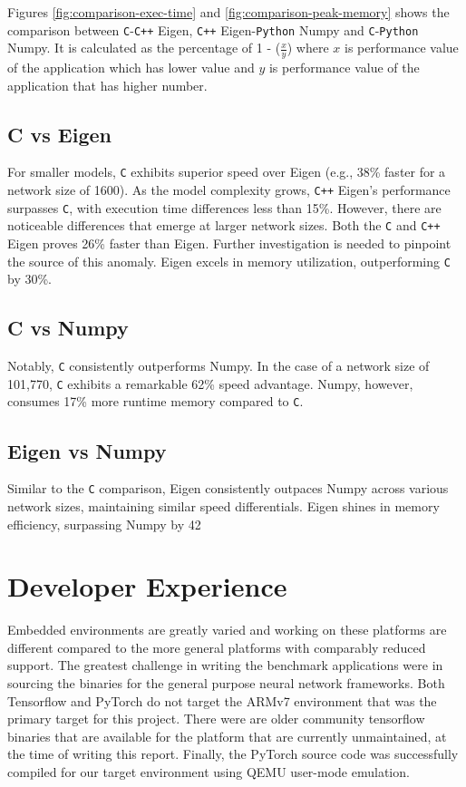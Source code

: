 Figures \ref{fig:comparison-exec-time} and \ref{fig:comparison-peak-memory} shows the comparison between \texttt{C}-\texttt{C++} Eigen, \texttt{C++} Eigen-\texttt{Python} Numpy and \texttt{C}-\texttt{Python} Numpy. It is calculated as the percentage of 1 - ($\frac{x}{y}$) where $x$ is performance value of the application which has lower value and $y$ is performance value of the application that has higher number.

\subsection{C vs Eigen}

For smaller models, \texttt{C} exhibits superior speed over Eigen (e.g., 38\% faster for a network size of 1600). As the model complexity grows, \texttt{C++} Eigen's performance surpasses \texttt{C}, with execution time differences less than 15\%. However, there are noticeable differences that emerge at larger network sizes. Both the \texttt{C} and \texttt{C++} Eigen proves 26\% faster than Eigen. Further investigation is needed to pinpoint the source of this anomaly. Eigen excels in memory utilization, outperforming \texttt{C} by 30\%.

\subsection{C vs Numpy}

Notably, \texttt{C} consistently outperforms Numpy. In the case of a network size of 101,770, \texttt{C} exhibits a remarkable 62\% speed advantage. Numpy, however, consumes 17\% more runtime memory compared to \texttt{C}.

\subsection{Eigen vs Numpy}

Similar to the \texttt{C} comparison, Eigen consistently outpaces Numpy across various network sizes, maintaining similar speed differentials. Eigen shines in memory efficiency, surpassing Numpy by 42%

\section{Developer Experience}

Embedded environments are greatly varied and working on these platforms are different compared to the more general platforms with comparably reduced support. The greatest challenge in writing the benchmark applications were in sourcing the binaries for the general purpose neural network frameworks. Both Tensorflow and PyTorch do not target the ARMv7 environment that was the primary target for this project. There were are older community tensorflow binaries that are available for the platform that are currently unmaintained, at the time of writing this report. Finally, the PyTorch source code was successfully compiled for our target environment using QEMU user-mode emulation.

